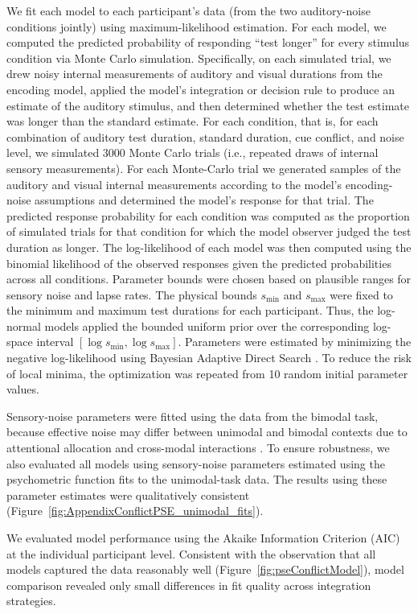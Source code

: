 \documentclass{biorxiv}
\providecommand{\citep}[1]{\cite{#1}}
\begin{document}
We fit each model to each participant's data (from the two auditory-noise conditions jointly) using maximum-likelihood estimation. For each model, we computed the predicted probability of responding ``test longer'' for every stimulus condition via Monte Carlo simulation. Specifically, on each simulated trial, we drew noisy internal measurements of auditory and visual durations from the encoding model, applied the model's integration or decision rule to produce an estimate of the auditory stimulus, and then determined whether the test estimate was longer than the standard estimate. For each condition, that is, for each combination of auditory test duration, standard duration, cue conflict, and noise level, we simulated 3000 Monte Carlo trials (i.e., repeated draws of internal sensory measurements). For each Monte-Carlo trial we generated samples of the auditory and visual internal measurements according to the model's encoding-noise assumptions and determined the model's response for that trial. The predicted response probability for each condition was computed as the proportion of simulated trials for that condition for which the model observer judged the test duration as longer. The log-likelihood of each model was then computed using the binomial likelihood of the observed responses given the predicted probabilities across all conditions. Parameter bounds were chosen based on plausible ranges for sensory noise and lapse rates. The physical bounds $s_{\min}$ and $s_{\max}$ were fixed to the minimum and maximum test durations for each participant. Thus, the log-normal models applied the bounded uniform prior over the corresponding log-space interval $[\log s_{\min},\log s_{\max}]$. Parameters were estimated by minimizing the negative log-likelihood using Bayesian Adaptive Direct Search \citep{acerbi2017practical}. To reduce the risk of local minima, the optimization was repeated from 10 random initial parameter values.

Sensory-noise parameters were fitted using the data from the bimodal task, because effective noise may differ between unimodal and bimodal contexts due to attentional allocation and cross-modal interactions \citep{badde2020modality}. To ensure robustness, we also evaluated all models using sensory-noise parameters estimated using the psychometric function fits to the unimodal-task data. The results using these parameter estimates were qualitatively consistent (Figure~\ref{fig:AppendixConflictPSE_unimodal_fits}).

We evaluated model performance using the Akaike Information Criterion (AIC) at the individual participant level. Consistent with the observation that all models captured the data reasonably well (Figure~\ref{fig:pseConflictModel}), model comparison revealed only small differences in fit quality across integration strategies.
\end{document}
